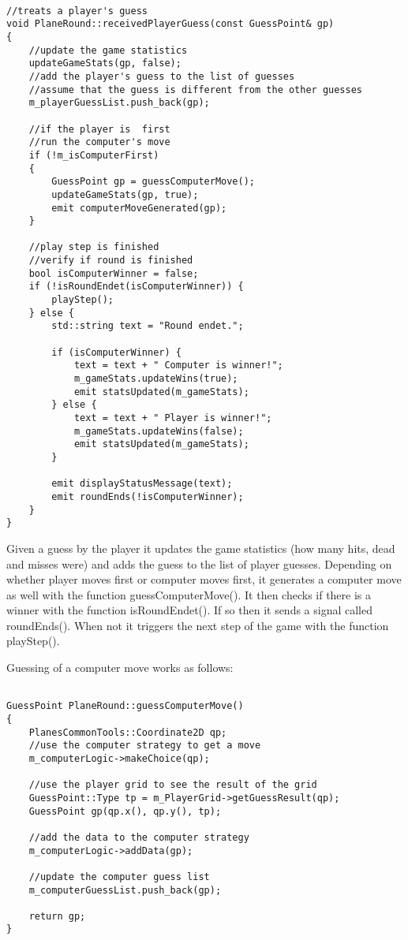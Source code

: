 \begin{lstlisting}

//treats a player's guess
void PlaneRound::receivedPlayerGuess(const GuessPoint& gp)
{
	//update the game statistics
	updateGameStats(gp, false);
	//add the player's guess to the list of guesses
	//assume that the guess is different from the other guesses
	m_playerGuessList.push_back(gp);
	
	//if the player is  first
	//run the computer's move
	if (!m_isComputerFirst)
	{
		GuessPoint gp = guessComputerMove();
		updateGameStats(gp, true);
		emit computerMoveGenerated(gp);
	}
	
	//play step is finished
	//verify if round is finished
	bool isComputerWinner = false;
	if (!isRoundEndet(isComputerWinner)) {
		playStep();
	} else {
		std::string text = "Round endet.";
		
		if (isComputerWinner) {
			text = text + " Computer is winner!";
			m_gameStats.updateWins(true);
			emit statsUpdated(m_gameStats);
		} else {
			text = text + " Player is winner!";
			m_gameStats.updateWins(false);
			emit statsUpdated(m_gameStats);
		}
		
		emit displayStatusMessage(text);
		emit roundEnds(!isComputerWinner);
	}
}

\end{lstlisting}

Given a guess by the player it updates the game statistics (how many hits, dead and misses were) and adds the guess to the list of player guesses. Depending on whether player moves first or computer moves first, it generates a computer move as well with the function guessComputerMove(). It then checks if there is a winner with the function isRoundEndet(). If so then it sends a signal called roundEnds(). When not it triggers the next step of the game with the function playStep().

Guessing of a computer move works as follows:

\begin{lstlisting}

GuessPoint PlaneRound::guessComputerMove()
{
	PlanesCommonTools::Coordinate2D qp;
	//use the computer strategy to get a move
	m_computerLogic->makeChoice(qp);
	
	//use the player grid to see the result of the grid
	GuessPoint::Type tp = m_PlayerGrid->getGuessResult(qp);
	GuessPoint gp(qp.x(), qp.y(), tp);
	
	//add the data to the computer strategy
	m_computerLogic->addData(gp);
	
	//update the computer guess list
	m_computerGuessList.push_back(gp);
	
	return gp;
}

\end{lstlisting}

